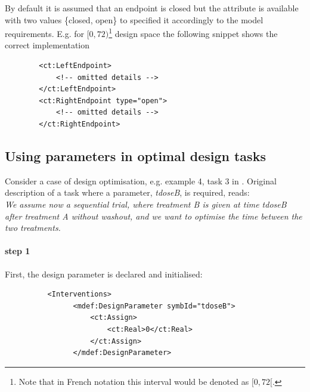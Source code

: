 By default it is assumed that an endpoint is closed but the attribute 
is available with two values \{closed, open\} to specified it accordingly to the 
model requirements. E.g. for $[0,72)$\footnote{Note that in French notation this interval
would be denoted as $[0,72[$.} design space the following snippet shows the 
correct implementation
\lstset{language=XML}
\begin{lstlisting}
        <ct:LeftEndpoint>
            <!-- omitted details -->
        </ct:LeftEndpoint>
        <ct:RightEndpoint type="open">
            <!-- omitted details -->
        </ct:RightEndpoint>
\end{lstlisting}



\subsection{Using parameters in optimal design tasks} 
\label{subsec:paramsInDesign}
Consider a case of design optimisation, e.g. example 4, task 3 in 
\cite{CommetsExamples2015}. Original description of a task where 
a parameter, \emph{tdoseB}, is required, reads: \\
\emph{We assume now a sequential trial, where treatment B is given 
at time tdoseB after treatment A without washout, and we want to 
optimise the time between the two treatments.} 

\paragraph{step 1} First, the design parameter is declared and initialised: 
\lstset{language=XML}
\begin{lstlisting}
          <Interventions>
                <mdef:DesignParameter symbId="tdoseB">
                    <ct:Assign>
                        <ct:Real>0</ct:Real>
                    </ct:Assign>
                </mdef:DesignParameter>
\end{lstlisting}
